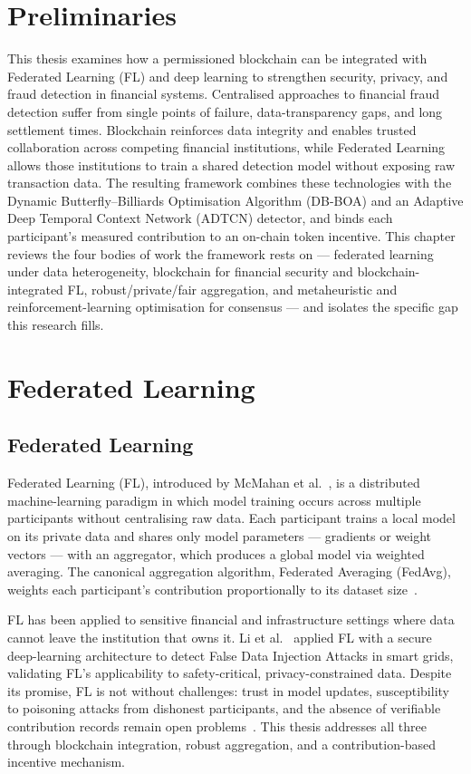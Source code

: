 \section{Preliminaries}
This thesis examines how a permissioned blockchain can be integrated with Federated Learning (FL) and deep learning to strengthen security, privacy, and fraud detection in financial systems. Centralised approaches to financial fraud detection suffer from single points of failure, data-transparency gaps, and long settlement times. Blockchain reinforces data integrity and enables trusted collaboration across competing financial institutions, while Federated Learning allows those institutions to train a shared detection model without exposing raw transaction data. The resulting framework combines these technologies with the Dynamic Butterfly--Billiards Optimisation Algorithm (DB-BOA) and an Adaptive Deep Temporal Context Network (ADTCN) detector, and binds each participant's measured contribution to an on-chain token incentive. This chapter reviews the four bodies of work the framework rests on --- federated learning under data heterogeneity, blockchain for financial security and blockchain-integrated FL, robust/private/fair aggregation, and metaheuristic and reinforcement-learning optimisation for consensus --- and isolates the specific gap this research fills.

\section{Federated Learning}

\subsection{Federated Learning}

Federated Learning (FL), introduced by McMahan et al.~\cite{mcmahan2017}, is a distributed machine-learning paradigm in which model training occurs across multiple participants without centralising raw data. Each participant trains a local model on its private data and shares only model parameters --- gradients or weight vectors --- with an aggregator, which produces a global model via weighted averaging. The canonical aggregation algorithm, Federated Averaging (FedAvg), weights each participant's contribution proportionally to its dataset size~\cite{mcmahan2017}.

FL has been applied to sensitive financial and infrastructure settings where data cannot leave the institution that owns it. Li et al.~\cite{li2022fdia} applied FL with a secure deep-learning architecture to detect False Data Injection Attacks in smart grids, validating FL's applicability to safety-critical, privacy-constrained data. Despite its promise, FL is not without challenges: trust in model updates, susceptibility to poisoning attacks from dishonest participants, and the absence of verifiable contribution records remain open problems~\cite{10701002}. This thesis addresses all three through blockchain integration, robust aggregation, and a contribution-based incentive mechanism.

